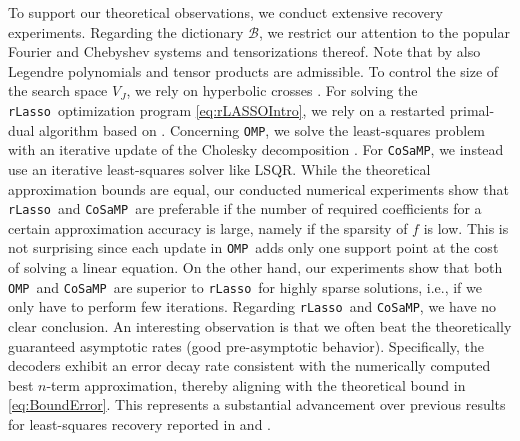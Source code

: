 \documentclass[11pt,reqno, a4paper]{article}
\numberwithin{equation}{section}
\newcommand{\rlasso}{\texttt{rLasso}}
\newcommand{\omp}{\texttt{OMP}}
\newcommand{\cosamp}{\texttt{CoSaMP}}
\begin{document}
To support our theoretical observations, we conduct extensive recovery experiments.
Regarding the dictionary $\mathcal{B}$, we restrict our attention to the popular Fourier and Chebyshev systems and tensorizations thereof. Note that by  also Legendre polynomials and tensor products are admissible.  
To control the size of the search space $V_J$, we rely on hyperbolic crosses \cite{DTU18}.
For solving the \rlasso \ optimization program \eqref{eq:rLASSOIntro}, we rely on a restarted primal-dual algorithm based on \cite{AdcCol2025}. 
Concerning \omp, we solve the least-squares problem with an iterative update of the Cholesky decomposition \cite{StuChr2012}.
For \cosamp, we instead use an iterative least-squares solver like LSQR.
While the theoretical approximation bounds are equal, our conducted numerical experiments show that \rlasso \ and \cosamp \ are preferable if the number of required coefficients for a certain approximation accuracy is large, namely if the sparsity of $f$ is low.
This is not surprising since each update in \omp \ adds only one support point at the cost of solving a linear equation.
On the other hand, our experiments show that both \omp \ and \cosamp \ are superior to \rlasso \ for highly sparse solutions, i.e., if we only have to perform few iterations. 
Regarding \rlasso \ and \cosamp, we have no clear conclusion.
An interesting observation is that we often beat the theoretically guaranteed asymptotic rates (good pre-asymptotic behavior).
Specifically, the decoders exhibit an error decay rate consistent with the numerically computed best $n$-term approximation, thereby aligning with the theoretical bound in \eqref{eq:BoundError}.
This represents a substantial advancement over previous results for least-squares recovery reported in \cite{KamUllVol2021} and \cite{BarLutNag2023}. 
\end{document}
